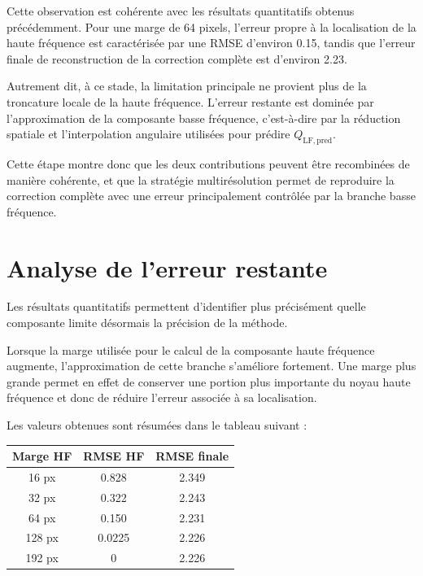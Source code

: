 \documentclass[11pt,a4paper]{report}
\begin{document}
Cette observation est cohérente avec les résultats quantitatifs obtenus
précédemment. Pour une marge de 64 pixels, l'erreur propre à la
localisation de la haute fréquence est caractérisée par une RMSE
d'environ 0.15, tandis que l'erreur finale de reconstruction de la
correction complète est d'environ 2.23.

Autrement dit, à ce stade, la limitation principale ne provient plus de la
troncature locale de la haute fréquence. L'erreur restante est dominée par
l'approximation de la composante basse fréquence, c'est-à-dire par la
réduction spatiale et l'interpolation angulaire utilisées pour prédire
$Q_{\mathrm{LF,pred}}$.

Cette étape montre donc que les deux contributions peuvent être recombinées
de manière cohérente, et que la stratégie multirésolution permet de
reproduire la correction complète avec une erreur principalement contrôlée
par la branche basse fréquence.



\chapter{Analyse de l'erreur restante}

Les résultats quantitatifs permettent d'identifier plus précisément quelle
composante limite désormais la précision de la méthode.

Lorsque la marge utilisée pour le calcul de la composante haute fréquence
augmente, l'approximation de cette branche s'améliore fortement. Une marge
plus grande permet en effet de conserver une portion plus importante du
noyau haute fréquence et donc de réduire l'erreur associée à sa
localisation.

Les valeurs obtenues sont résumées dans le tableau suivant :

\begin{center}
\begin{tabular}{ccc}
\toprule
\textbf{Marge HF} &
\textbf{RMSE HF} &
\textbf{RMSE finale}\\
\midrule
16 px  & 0.828  & 2.349\\
32 px  & 0.322  & 2.243\\
64 px  & 0.150  & 2.231\\
128 px & 0.0225 & 2.226\\
192 px & 0      & 2.226\\
\bottomrule
\end{tabular}
\end{center}
\end{document}
